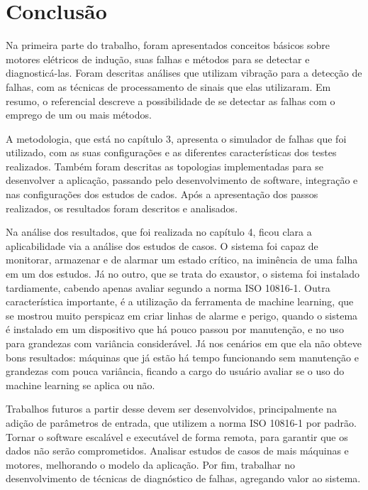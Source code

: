 
\chapter[Conclusão]{Conclusão}

Na primeira parte do trabalho, foram apresentados conceitos básicos sobre motores elétricos de indução, suas falhas e métodos para se 
detectar e diagnosticá-las. Foram descritas análises que utilizam vibração para a detecção de falhas, com as
técnicas de processamento de sinais que elas utilizaram. Em resumo, o referencial descreve a possibilidade de se detectar
as falhas com o emprego de um ou mais métodos.

A metodologia, que está no capítulo 3, apresenta o simulador de falhas que foi utilizado, com as suas configurações e as
diferentes características dos testes realizados. Também foram descritas as topologias implementadas para se desenvolver a aplicação, passando 
pelo desenvolvimento de software, integração e nas configurações dos estudos de cados. 
Após a apresentação dos passos realizados, os resultados foram descritos e analisados.

Na análise dos resultados, que foi realizada no capítulo 4, ficou clara a aplicabilidade via a análise dos estudos de casos. O sistema foi
capaz de monitorar, armazenar e de alarmar um estado crítico, na iminência de uma falha em um dos estudos. Já no outro, que se trata do exaustor,
o sistema foi instalado tardiamente, cabendo apenas avaliar segundo a norma ISO 10816-1. Outra característica importante, é a utilização da
ferramenta de machine learning, que se mostrou muito perspicaz em criar linhas de alarme e perigo, quando o sistema é instalado em um dispositivo
que há pouco passou por manutenção, e no uso para grandezas com variância considerável. Já nos cenários em que ela não obteve bons resultados:
máquinas que já estão há tempo funcionando sem manutenção e grandezas com pouca variância, ficando a cargo do usuário avaliar se o uso do 
machine learning se aplica ou não. 

Trabalhos futuros a partir desse devem ser desenvolvidos, principalmente na adição de parâmetros de entrada, que utilizem a norma ISO 10816-1
por padrão. Tornar o software escalável e executável de forma remota, para garantir que os dados não serão comprometidos. Analisar estudos de 
casos de mais máquinas e motores, melhorando o modelo da aplicação. Por fim, trabalhar no desenvolvimento de técnicas de diagnóstico de falhas,
agregando valor ao sistema. 





